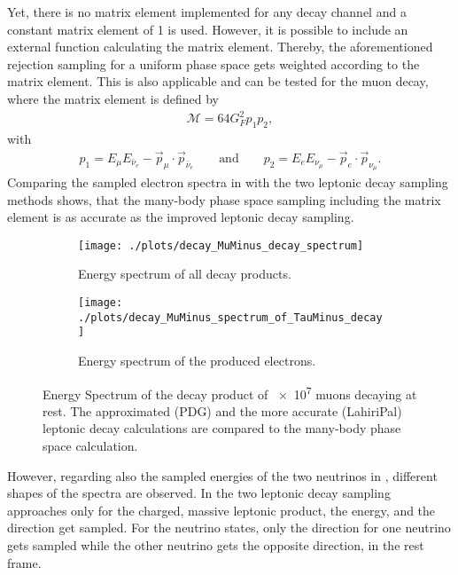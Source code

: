 Yet, there is no matrix element implemented for any decay channel and a constant matrix element of 1 is used.
However, it is possible to include an external function calculating the matrix element.
Thereby, the aforementioned rejection sampling for a uniform phase space gets weighted according to the matrix element.
This is also applicable and can be tested for the muon decay, where the matrix element is defined by
\begin{align}
    \mathcal{M} = 64 G_F^2 p_1 p_2 ,
\end{align}
with
\begin{align}
    p_1 = E_\mu E_{\bar{\nu}_e} - \vec{p}_\mu \cdot \vec{p}_{\bar{\nu}_e}
    \qquad \text{and} \qquad
    p_2 = E_e E_{\nu_\mu} - \vec{p}_e \cdot \vec{p}_{\nu_\mu} .
\end{align}
Comparing the sampled electron spectra in  with the two leptonic decay sampling methods shows, that the many-body phase space sampling including the matrix element is as accurate as the improved leptonic decay sampling.
\begin{figure}
    \centering
    \begin{subfigure}{0.8\textwidth}
        \centering
        \texttt{[image: ./plots/decay\_MuMinus\_decay\_spectrum]}
        \caption{Energy spectrum of all decay products.}
        \label{fig:decay_sampling_all_products}
        \vspace{0.5cm}
    \end{subfigure}
    \begin{subfigure}{0.8\textwidth}
        \centering
        \texttt{[image: ./plots/decay\_MuMinus\_spectrum\_of\_TauMinus\_decay]}
        \caption{Energy spectrum of the produced electrons.}
        \label{fig:decay_sampling_mu_products}
    \end{subfigure}
    \caption{Energy Spectrum of the decay product of \num{e7} muons decaying at rest. The approximated (PDG) and the more accurate (LahiriPal) leptonic decay calculations are compared to the many-body phase space calculation.}
    \label{fig:decay_sampling}
\end{figure}
However, regarding also the sampled energies of the two neutrinos in , different shapes of the spectra are observed.
In the two leptonic decay sampling approaches only for the charged, massive leptonic product, the energy, and the direction get sampled.
For the neutrino states, only the direction for one neutrino gets sampled while the other neutrino gets the opposite direction, in the rest frame.
